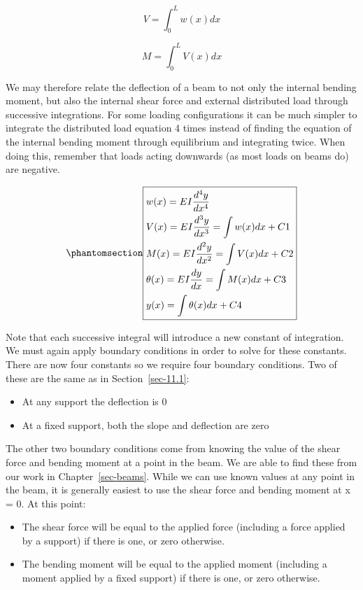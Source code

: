 \documentclass[
  letterpaper,
  DIV=11,
  numbers=noendperiod]{scrreprt}
\theoremstyle{definition}
\theoremstyle{remark}
\begin{document}
\[
V=\int_{0}^{L} w(x) d x
\]

\[
M=\int_{0}^{L} V(x) d x
\]

We may therefore relate the deflection of a beam to not only the
internal bending moment, but also the internal shear force and external
distributed load through successive integrations. For some loading
configurations it can be much simpler to integrate the distributed load
equation 4 times instead of finding the equation of the internal bending
moment through equilibrium and integrating twice. When doing this,
remember that loads acting downwards (as most loads on beams do) are
negative.

\begin{equation}\phantomsection\label{eq-11.2}{
\boxed{\begin{aligned}
&w(x)=E I \frac{d^{4} y}{d x^{4}} \\
&V(x)=E I \frac{d^{3} y}{d x^{3}}=\int w(x) d x+C 1 \\
&M(x)=E I \frac{d^{2} y}{d x^{2}}=\int V(x) d x+C 2 \\
&\theta(x)=E I \frac{d y}{d x}=\int M(x) d x+C 3 \\
&y(x)=\int \theta(x) d x+C 4
\end{aligned}}
}\end{equation}

Note that each successive integral will introduce a new constant of
integration. We must again apply boundary conditions in order to solve
for these constants. There are now four constants so we require four
boundary conditions. Two of these are the same as in
Section~\ref{sec-11.1}:

\begin{itemize}
\item
  At any support the deflection is 0
\item
  At a fixed support, both the slope and deflection are zero
\end{itemize}

The other two boundary conditions come from knowing the value of the
shear force and bending moment at a point in the beam. We are able to
find these from our work in Chapter~\ref{sec-beams}. While we can use
known values at any point in the beam, it is generally easiest to use
the shear force and bending moment at x = 0. At this point:

\begin{itemize}
\item
  The shear force will be equal to the applied force (including a force
  applied by a support) if there is one, or zero otherwise.
\item
  The bending moment will be equal to the applied moment (including a
  moment applied by a fixed support) if there is one, or zero otherwise.
\end{itemize}
\end{document}
